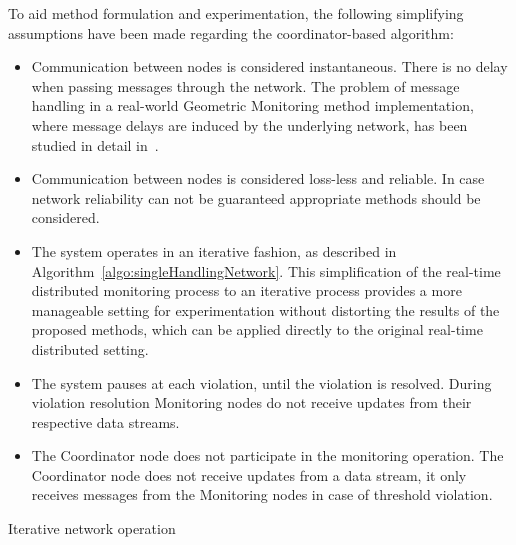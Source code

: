 To aid method formulation and experimentation, the following simplifying assumptions have been made regarding the coordinator-based algorithm:
\begin{itemize}
\item Communication between nodes is considered instantaneous. There is no delay when passing messages through the network. The problem of message handling in a real-world Geometric Monitoring method implementation, where message delays are induced by the underlying network, has been studied in detail in~\cite{Babis2013SimulatorStreams}.

\item Communication between nodes is considered loss-less and reliable. In case network reliability can not be guaranteed appropriate methods should be considered.

\item The system operates in an iterative fashion, as described in Algorithm~\ref{algo:singleHandlingNetwork}. This simplification of the real-time distributed monitoring process to an iterative process provides a more manageable setting for experimentation without distorting the results of the proposed methods, which can be applied directly to the original real-time distributed setting.

\item The system pauses at each violation, until the violation is resolved. During violation resolution Monitoring nodes do not receive updates from their respective data streams.

\item The Coordinator node does not participate in the monitoring operation. The Coordinator node does not receive updates from a data stream, it only receives messages from the Monitoring nodes in case of threshold violation.

\end{itemize}


\begin{algorithm}[H]


\SetAlgoLined
{}
\caption{Iterative network operation \label{algo:singleHandlingNetwork}} 
\end{algorithm}

